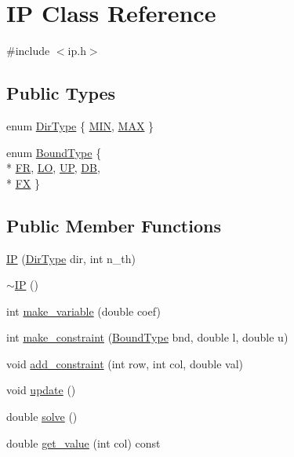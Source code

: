 \hypertarget{class_i_p}{\section{I\+P Class Reference}
\label{class_i_p}
}


{\ttfamily \#include $<$ip.\+h$>$}

\subsection*{Public Types}
\begin{DoxyCompactItemize}
\item 
enum \hyperlink{class_i_p_af88e6fdfab32c2ed183920793a376ef7}{Dir\+Type} \{ \hyperlink{class_i_p_af88e6fdfab32c2ed183920793a376ef7a8c5f4cad2750385017e5f4130b493ae2}{M\+I\+N}, 
\hyperlink{class_i_p_af88e6fdfab32c2ed183920793a376ef7a02d565f05c7c5bc19b435ee28ad118e7}{M\+A\+X}
 \}
\item 
enum \hyperlink{class_i_p_ad3e0d9963922726d47f2f913aa2c8dca}{Bound\+Type} \{ \\*
\hyperlink{class_i_p_ad3e0d9963922726d47f2f913aa2c8dcaa3ac516e2eeda7996cdaad1e53db2d908}{F\+R}, 
\hyperlink{class_i_p_ad3e0d9963922726d47f2f913aa2c8dcaa7f6843d9ed7bee9109e014933d237aaa}{L\+O}, 
\hyperlink{class_i_p_ad3e0d9963922726d47f2f913aa2c8dcaa9beec925faa9260f06491e71e337d1c7}{U\+P}, 
\hyperlink{class_i_p_ad3e0d9963922726d47f2f913aa2c8dcaac182842ac60265785e06d0f5ac0afa6e}{D\+B}, 
\\*
\hyperlink{class_i_p_ad3e0d9963922726d47f2f913aa2c8dcaad4599f2dd371dd5cc34f7c1d4050be29}{F\+X}
 \}
\end{DoxyCompactItemize}
\subsection*{Public Member Functions}
\begin{DoxyCompactItemize}
\item 
\hyperlink{class_i_p_a3f2cca8cf1bb5dc81c01ddebbc10b485}{I\+P} (\hyperlink{class_i_p_af88e6fdfab32c2ed183920793a376ef7}{Dir\+Type} dir, int n\+\_\+th)
\item 
\hyperlink{class_i_p_a5bb585bc3989eb9d800e56214a09287e}{$\sim$\+I\+P} ()
\item 
int \hyperlink{class_i_p_a5d886fd73f854d45edf0deed7725f1b7}{make\+\_\+variable} (double coef)
\item 
int \hyperlink{class_i_p_a69c73c2ff766acd2c6191999c3d0902c}{make\+\_\+constraint} (\hyperlink{class_i_p_ad3e0d9963922726d47f2f913aa2c8dca}{Bound\+Type} bnd, double l, double u)
\item 
void \hyperlink{class_i_p_aef4a713b86874bacbd6137d7fbd4a2cb}{add\+\_\+constraint} (int row, int col, double val)
\item 
void \hyperlink{class_i_p_aad094e5a2eba9883c75ef69a6e20a7c5}{update} ()
\item 
double \hyperlink{class_i_p_a9e33cc37ef1c24c06593a47bad87c340}{solve} ()
\item 
double \hyperlink{class_i_p_a2b0a691fa6e9db4bc4aa5f6c3289d2ec}{get\+\_\+value} (int col) const 
\end{DoxyCompactItemize}



